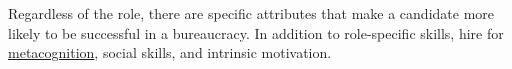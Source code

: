 
Regardless of the role, there are specific attributes that make a candidate more likely to be successful in a bureaucracy. In addition to role-specific skills, hire for \href{https://en.wikipedia.org/wiki/Metacognition}{metacognition},
\iftoggle{WPinmargin}{\marginpar{[Wikipedia] Metacognition}}{}
social skills, and intrinsic motivation.




